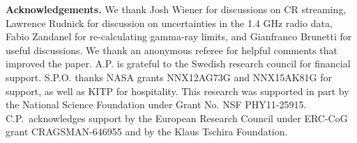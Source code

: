 \documentclass[fleqn,usenatbib,useAMS]{mnras}
\begin{document}
{\bf Acknowledgements.} We thank Josh Wiener for discussions on CR streaming,
Lawrence Rudnick for discussion on uncertainties in the 1.4 GHz radio data,
Fabio Zandanel for re-calculating gamma-ray limits, and Gianfranco Brunetti for
useful discussions. We thank an anonymous referee for helpful comments that
improved the paper. A.P. is grateful to the Swedish research council for
financial support. S.P.O. thanks NASA grants NNX12AG73G and NNX15AK81G for
support, as well as KITP for hospitality. This research was supported in part by
the National Science Foundation under Grant No. NSF
PHY11-25915. C.P.~acknowledges support by the European Research Council under
ERC-CoG grant CRAGSMAN-646955 and by the Klaus Tschira Foundation.


\vspace{-0.7cm}



\end{document}

